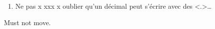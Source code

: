 \documentclass{beamer}
\begin{document}
\begin{frame}[t]
\begin{enumerate}[<+->]
\RaggedRight

\item Ne pas x xxx x oublier qu'un décimal peut s'écrire avec des
\only<.>{\nolinebreak\dots }

\end{enumerate}

Must not move.

\end{frame}
\end{document}
